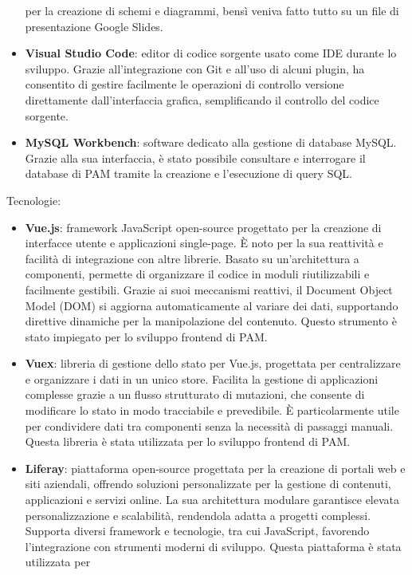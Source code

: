 \begin{itemize}
    per la creazione di schemi e diagrammi, bensì veniva fatto tutto su un file di presentazione Google Slides.
    \item \textbf{Visual Studio Code}: editor di codice sorgente usato come IDE durante lo sviluppo. Grazie all'integrazione con Git e all'uso di alcuni plugin, ha consentito
    di gestire facilmente le operazioni di controllo versione direttamente dall’interfaccia grafica, semplificando il controllo del codice sorgente.
    \item \textbf{MySQL Workbench}: software dedicato alla gestione di database MySQL. Grazie alla sua interfaccia, è stato possibile consultare e interrogare il database di \ac{PAM}
    tramite la creazione e l’esecuzione di query SQL.
\end{itemize}

Tecnologie:
\begin{itemize}
    \item \textbf{Vue.js}: framework JavaScript open-source progettato per la creazione di interfacce utente e applicazioni single-page. È noto per la sua reattività e
    facilità di integrazione con altre librerie. Basato su un’architettura a componenti, permette di organizzare il codice in moduli riutilizzabili e facilmente
    gestibili. Grazie ai suoi meccanismi reattivi, il Document Object Model (DOM) si aggiorna automaticamente al variare dei dati, supportando direttive dinamiche
    per la manipolazione del contenuto. Questo strumento è stato impiegato per lo sviluppo frontend di \ac{PAM}.
    \item \textbf{Vuex}: libreria di gestione dello stato per Vue.js, progettata per centralizzare e organizzare i dati in un unico store. Facilita la gestione di
    applicazioni complesse grazie a un flusso strutturato di mutazioni, che consente di modificare lo stato in modo tracciabile e prevedibile. È particolarmente utile
    per condividere dati tra componenti senza la necessità di passaggi manuali. Questa libreria è stata utilizzata per lo sviluppo frontend di \ac{PAM}.
    \item \textbf{Liferay}: piattaforma open-source progettata per la creazione di portali web e siti aziendali, offrendo soluzioni personalizzate per la gestione di
    contenuti, applicazioni e servizi online. La sua architettura modulare garantisce elevata personalizzazione e scalabilità, rendendola adatta a progetti complessi.
    Supporta diversi framework e tecnologie, tra cui JavaScript, favorendo l’integrazione con strumenti moderni di sviluppo. Questa piattaforma è stata utilizzata per

\end{itemize}
